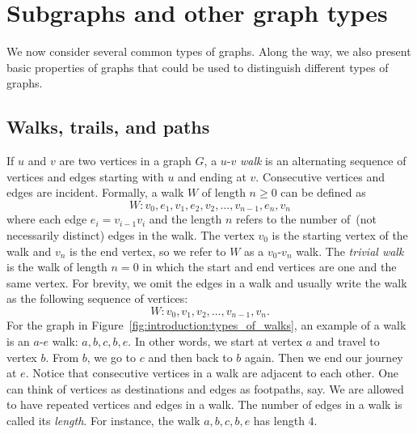 
\section{Subgraphs and other graph types}
\label{sec:introduction:subgraphs_graph_types}

We now consider several common types of graphs. Along the way, we also
present basic properties of graphs that could be used to distinguish
different types of graphs.



\subsection{Walks, trails, and paths}

If $u$ and $v$ are two vertices in a graph $G$, a $u$-$v$ \emph{walk}
is an alternating sequence of vertices and edges starting with $u$ and
ending at $v$. Consecutive vertices and edges are incident. Formally,
a walk $W$ of length $n \geq 0$ can be defined as
\[
W: v_0, e_1, v_1, e_2, v_2, \dots, v_{n-1}, e_n, v_n
\]
where each edge $e_i = v_{i-1} v_i$ and the length $n$ refers to the
number of~(not necessarily distinct) edges in the walk. The vertex
$v_0$ is the starting vertex of the walk and $v_n$ is the end vertex,
so we refer to $W$ as a $v_0$-$v_n$ walk. The \emph{trivial walk} is
the walk of length $n = 0$ in which the start and end vertices are one
and the same vertex. For brevity, we omit the edges in a walk and
usually write the walk as the following sequence of vertices:
\[
W: v_0, v_1, v_2, \dots, v_{n-1}, v_n.
\]
For the graph in Figure~\ref{fig:introduction:types_of_walks}, an
example of a walk is an $a$-$e$ walk: $a, b, c, b, e$. In other words,
we start at vertex $a$ and travel to vertex $b$. From $b$, we go to
$c$ and then back to $b$ again. Then we end our journey at $e$. Notice
that consecutive vertices in a walk are adjacent to each other. One
can think of vertices as destinations and edges as footpaths, say. We
are allowed to have repeated vertices and edges in a walk. The number
of edges in a walk is called its \emph{length}. For instance, the
walk $a, b, c, b, e$ has length $4$.

